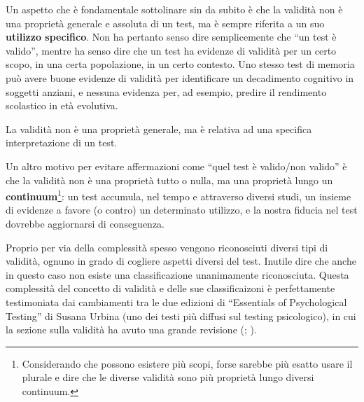 \documentclass[
  italian,
  letterpaper,
  paper=A4,
  headinclude=on,
  footinclude=on,
  12pt]{scrbook}
\begin{document}
Un aspetto che è fondamentale sottolinare sin da subito è che la
validità non è una proprietà generale e assoluta di un test, ma è sempre
riferita a un suo \textbf{utilizzo specifico}. Non ha pertanto senso
dire semplicemente che ``un test è valido'', mentre ha senso dire che un
test ha evidenze di validità per un certo scopo, in una certa
popolazione, in un certo contesto. Uno stesso test di memoria può avere
buone evidenze di validità per identificare un decadimento cognitivo in
soggetti anziani, e nessuna evidenza per, ad esempio, predire il
rendimento scolastico in età evolutiva.

\begin{tcolorbox}[enhanced jigsaw, left=2mm, colbacktitle=quarto-callout-tip-color!10!white, bottomrule=.15mm, opacityback=0, coltitle=black, colframe=quarto-callout-tip-color-frame, opacitybacktitle=0.6, leftrule=.75mm, colback=white, toprule=.15mm, title=\textcolor{quarto-callout-tip-color}{\faLightbulb}\hspace{0.5em}{Non ha senso dire che un test ``è valido''.}, titlerule=0mm, arc=.35mm, breakable, rightrule=.15mm, bottomtitle=1mm, toptitle=1mm]

La validità non è una proprietà generale, ma è relativa ad una specifica
interpretazione di un test.

\end{tcolorbox}

Un altro motivo per evitare affermazioni come ``quel test è valido/non
valido'' è che la validità non è una proprietà tutto o nulla, ma una
proprietà lungo un \textbf{continuum}\footnote{Considerando che possono
  esistere più scopi, forse sarebbe più esatto usare il plurale e dire
  che le diverse validità sono più proprietà lungo diversi continuum.}:
un test accumula, nel tempo e attraverso diversi studi, un insieme di
evidenze a favore (o contro) un determinato utilizzo, e la nostra
fiducia nel test dovrebbe aggiornarsi di conseguenza.

Proprio per via della complessità spesso vengono riconosciuti diversi
tipi di validità, ognuno in grado di cogliere aspetti diversi del test.
Inutile dire che anche in questo caso non esiste una classificazione
unanimamente riconosciuta. Questa complessità del concetto di validità e
delle sue classificaizoni è perfettamente testimoniata dai cambiamenti
tra le due edizioni di ``Essentials of Psychological Testing'' di Susana
Urbina (uno dei testi più diffusi sul testing psicologico), in cui la
sezione sulla validità ha avuto una grande revisione
(\cite{urbina2004essentials}; \cite{urbina2014essentials}).
\end{document}
